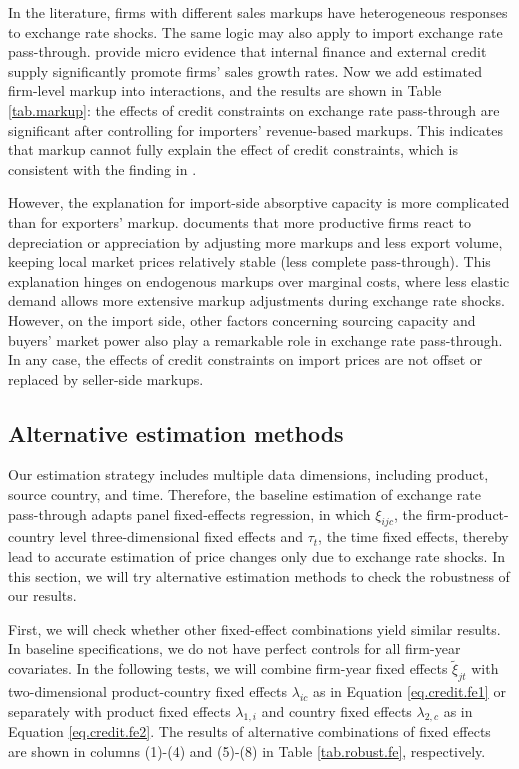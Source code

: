 In the literature, firms with different sales markups have heterogeneous responses to exchange rate shocks. The same logic may also apply to import exchange rate pass-through. \cite{llz2018} provide micro evidence that internal finance and external credit supply significantly promote firms' sales growth rates. Now we add estimated firm-level markup into interactions, and the results are shown in Table \ref{tab.markup}: the effects of credit constraints on exchange rate pass-through are significant after controlling for importers' revenue-based markups. This indicates that markup cannot fully explain the effect of credit constraints, which is consistent with the finding in \cite{xu-guo2021}.

However, the explanation for import-side absorptive capacity is more complicated than for exporters' markup. \cite{bmm2012} documents that more productive firms react to depreciation or appreciation by adjusting more markups and less export volume, keeping local market prices relatively stable (less complete pass-through). This explanation hinges on endogenous markups over marginal costs, where less elastic demand allows more extensive markup adjustments during exchange rate shocks. However, on the import side, other factors concerning sourcing capacity and buyers' market power also play a remarkable role in exchange rate pass-through. In any case, the effects of credit constraints on import prices are not offset or replaced by seller-side markups.

\subsection{Alternative estimation methods}

Our estimation strategy includes multiple data dimensions, including product, source country, and time. Therefore, the baseline estimation of exchange rate pass-through adapts panel fixed-effects regression, in which $\xi_{ijc}$, the firm-product-country level three-dimensional fixed effects and $\tau_t$, the time fixed effects, thereby lead to accurate estimation of price changes only due to exchange rate shocks. In this section, we will try alternative estimation methods to check the robustness of our results.

First, we will check whether other fixed-effect combinations yield similar results. In baseline specifications, we do not have perfect controls for all firm-year covariates. In the following tests, we will combine firm-year fixed effects $\tilde{\xi}_{jt}$ with two-dimensional product-country fixed effects $\lambda_{ic}$ as in Equation \ref{eq.credit.fe1} or separately with product fixed effects $\lambda_{1, i}$ and country fixed effects $\lambda_{2, c}$ as in Equation \ref{eq.credit.fe2}. The results of alternative combinations of fixed effects are shown in columns (1)-(4) and (5)-(8) in Table \ref{tab.robust.fe}, respectively. 

